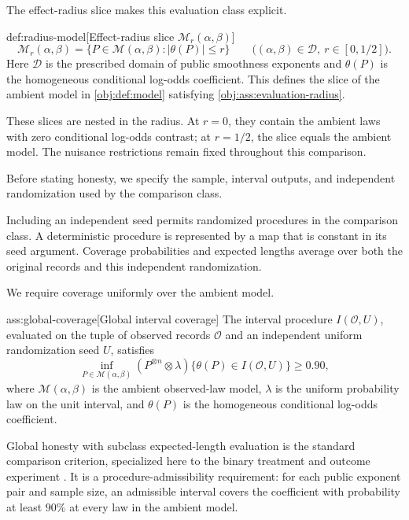 The effect-radius slice  makes this evaluation class explicit.

\begin{definitionv}{def:radius-model}[Effect-radius slice \(\mathcal M_r(\alpha,\beta)\)]
\[
\mathcal M_r(\alpha,\beta)
=
\{P\in\mathcal M(\alpha,\beta):|\theta(P)|\le r\}
\qquad
\bigl((\alpha,\beta)\in\mathcal D,\ r\in[0,1/2]\bigr).
\]
Here \(\mathcal D\) is the prescribed domain of public smoothness exponents and \(\theta(P)\) is the homogeneous conditional log-odds coefficient. This defines the slice of the ambient model in \cref{obj:def:model} satisfying \cref{obj:ass:evaluation-radius}.
\end{definitionv}

These slices are nested in the radius. At \(r=0\), they contain the ambient laws with zero conditional log-odds contrast; at \(r=1/2\), the slice equals the ambient model. The nuisance restrictions remain fixed throughout this comparison.

Before stating honesty, we specify the sample, interval outputs, and independent randomization used by the comparison class.



Including an independent seed permits randomized procedures in the comparison class. A deterministic procedure is represented by a map that is constant in its seed argument. Coverage probabilities and expected lengths average over both the original records and this independent randomization.

We require coverage uniformly over the ambient model.

\begin{assumptionv}{ass:global-coverage}[Global interval coverage]
The interval procedure \(I(\mathcal O,U)\), evaluated on the tuple of observed records \(\mathcal O\) and an independent uniform randomization seed \(U\), satisfies
\[
\inf_{P\in\mathcal M(\alpha,\beta)}
(P^{\otimes n}\otimes\lambda)
\{\theta(P)\in I(\mathcal O,U)\}\ge 0.90,
\]
where \(\mathcal M(\alpha,\beta)\) is the ambient observed-law model, \(\lambda\) is the uniform probability law on the unit interval, and \(\theta(P)\) is the homogeneous conditional log-odds coefficient.
\end{assumptionv}

Global honesty with subclass expected-length evaluation is the standard comparison criterion, specialized here to the binary treatment and outcome experiment \citep{CaiLow2004ConfidenceAdaptation}. It is a procedure-admissibility requirement: for each public exponent pair and sample size, an admissible interval covers the coefficient with probability at least \(90\%\) at every law in the ambient model.

